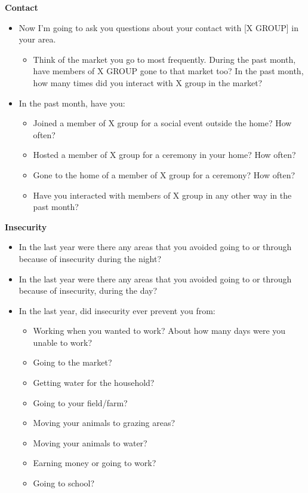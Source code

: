 \documentclass[11pt]{article}
\providecommand{\tightlist}{%
  \setlength{\itemsep}{0pt}\setlength{\parskip}{0pt}}
\begin{document}
\textbf{Contact}

\begin{itemize}
\tightlist
\item
  Now I'm going to ask you questions about your contact with {[}X
  GROUP{]} in your area.

  \begin{itemize}
  \tightlist
  \item
    Think of the market you go to most frequently. During the past
    month, have members of X GROUP gone to that market too? In the past
    month, how many times did you interact with X group in the market?
  \end{itemize}
\item
  In the past month, have you:

  \begin{itemize}
  \tightlist
  \item
    Joined a member of X group for a social event outside the home? How
    often?
  \item
    Hosted a member of X group for a ceremony in your home? How often?
  \item
    Gone to the home of a member of X group for a ceremony? How often?
  \item
    Have you interacted with members of X group in any other way in the
    past month?
  \end{itemize}
\end{itemize}

\textbf{Insecurity}

\begin{itemize}
\tightlist
\item
  In the last year were there any areas that you avoided going to or
  through because of insecurity during the night?
\item
  In the last year were there any areas that you avoided going to or
  through because of insecurity, during the day?
\item
  In the last year, did insecurity ever prevent you from:

  \begin{itemize}
  \tightlist
  \item
    Working when you wanted to work? About how many days were you unable
    to work?
  \item
    Going to the market?
  \item
    Getting water for the household?
  \item
    Going to your field/farm?
  \item
    Moving your animals to grazing areas?
  \item
    Moving your animals to water?
  \item
    Earning money or going to work?
  \item
    Going to school?
  \end{itemize}
\end{itemize}
\end{document}
